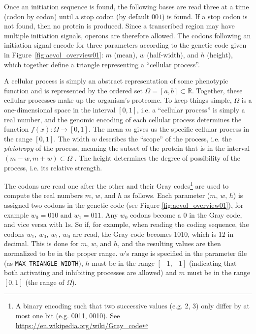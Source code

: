 Once an initiation sequence is found, the following bases are read three at a time (codon by codon) until a stop codon (by default $001$) is found. If a stop codon is not found, then no protein is produced. Since a transcribed region may have multiple initiation signals, operons are therefore allowed. The codons following an initiation signal encode for three parameters according to the genetic code given in Figure~\ref{fig:aevol_overview01}: $m$ (mean), $w$ (half-width), and $h$ (height), which together define a triangle representing a ``cellular process''.

A cellular process is simply an abstract representation of some phenotypic function and is represented by the ordered set $\Omega = \left[ a,b \right] \subset \mathbb{R}$. Together, these cellular processes make up the organism's proteome. To keep things simple, $\Omega$ is a one-dimensional space in the interval $\left[0,1\right]$, i.e. a ``cellular process'' is simply a real number, and the genomic encoding of each cellular process determines the function $f(x) : \Omega \rightarrow \left[0,1\right]$. The mean $m$ gives us the specific cellular process in the range $\left[0,1\right]$. The width $w$ describes the ``scope'' of the process, i.e. the \textit{pleiotropy} of the process, meaning the subset of the protein that is in the interval $ \left(m - w, m + w\right) \subset \Omega$ . The height determines the degree of possibility of the process, i.e. its relative strength.

The codons are read one after the other and their Gray codes\footnote{A binary encoding such that two successive values (e.g. 2, 3) only differ by at most one bit (e.g. 0011, 0010). See \url{https://en.wikipedia.org/wiki/Gray_code}} are used to compute the real numbers $m$, $w$, and $h$ as follows. Each parameter ($m$, $w$, $h$) is assigned two codons in the genetic code (see Figure \ref{fig:aevol_overview01}), for example $w_0 = 010$ and $w_1 = 011$. Any $w_0$ codons become a $0$ in the Gray code, and vice versa with $1$s. So if, for example, when reading the coding sequence, the codons $w_1$, $w_0$, $w_1$, $w_0$ are read, the Gray code becomes $1010$, which is 12 in decimal. This is done for $m$, $w$, and $h$, and the resulting values are then normalized to be in the proper range. $w$'s range is specified in the parameter file (as \texttt{MAX\_TRIANGLE\_WIDTH}), $h$ must be in the range $\left[-1,+1\right]$ (indicating that both activating and inhibiting processes are allowed) and $m$ must be in the range $\left[0,1\right]$ (the range of $\Omega$). 

